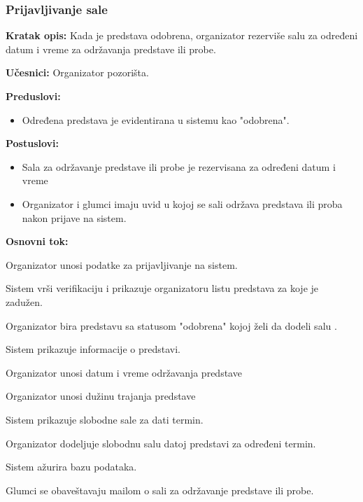 \documentclass[a4paper]{article}
\begin{document}
\subsubsection{Prijavljivanje sale}
\noindent\textbf{Kratak opis:} Kada je predstava odobrena, organizator rezerviše salu za određeni datum i vreme za održavanja predstave ili probe. 

\noindent\textbf{Učesnici:} Organizator pozorišta.

\noindent\textbf{Preduslovi:}
  \begin{itemize}
    \item Određena predstava je evidentirana u sistemu kao "odobrena".
  \end{itemize}

\noindent\textbf{Postuslovi:} 
  \begin{itemize}
    \item Sala za održavanje predstave ili probe je rezervisana za određeni datum i vreme
    \item Organizator i glumci imaju uvid u kojoj se sali održava predstava ili proba  nakon prijave na sistem.
  \end{itemize}

\noindent\textbf{Osnovni tok:}
  \begin{legal}
  \item Organizator unosi podatke za prijavljivanje na sistem.
    \item Sistem vrši verifikaciju i prikazuje organizatoru listu predstava za koje je zadužen.
    \item Organizator bira predstavu sa statusom "odobrena" kojoj želi da dodeli salu .
    \item Sistem prikazuje informacije o predstavi.
    \item Organizator unosi datum i vreme održavanja predstave
    \item Organizator unosi dužinu trajanja predstave
    \item Sistem prikazuje slobodne sale za dati termin.
    \item Organizator dodeljuje slobodnu salu datoj predstavi za određeni termin.
    \item Sistem ažurira bazu podataka.
    \item Glumci se obaveštavaju mailom o sali za održavanje predstave ili probe. 
  \end{legal}
\end{document}
